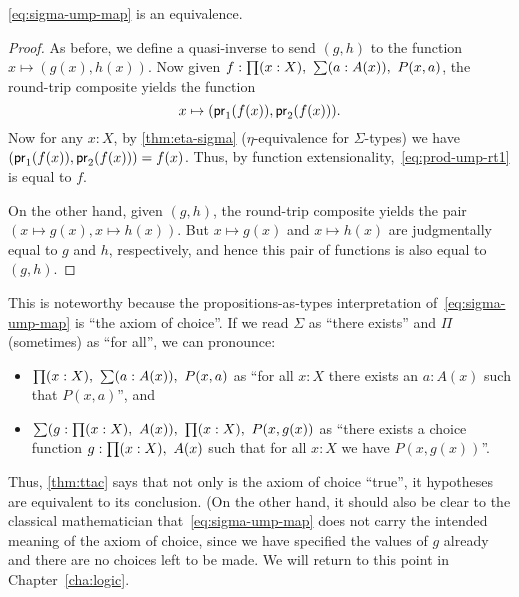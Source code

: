 \begin{thm}\label{thm:ttac}
  \eqref{eq:sigma-ump-map} is an equivalence.
\end{thm}
\begin{proof}
  As before, we define a quasi-inverse to send $(g,h)$ to the function $x\mapsto (g(x),h(x))$.
  Now given $f:\prd{x:X} \sm{a:A(x)} P(x,a)$, the round-trip composite yields the function
  \begin{equation}
    x\mapsto (\mathsf{pr}_{1}(f(x)),\mathsf{pr}_{2}(f(x))).\label{eq:prod-ump-rt1}
  \end{equation}
  Now for any $x:X$, by \autoref{thm:eta-sigma} ($\eta$-equivalence for $\Sigma$-types) we have $(\mathsf{pr}_{1}(f(x)),\mathsf{pr}_{2}(f(x))) = f(x)$.
  Thus, by function extensionality,~\eqref{eq:prod-ump-rt1} is equal to $f$.

  On the other hand, given $(g,h)$, the round-trip composite yields the pair $(x\mapsto g(x),x\mapsto h(x))$.
  But $x\mapsto g(x)$ and $x\mapsto h(x)$ are judgmentally equal to $g$ and $h$, respectively, and hence this pair of functions is also equal to $(g,h)$.
\end{proof}

This is noteworthy because the propositions-as-types interpretation of~\eqref{eq:sigma-ump-map} is ``the axiom of choice''.
If we read $\Sigma$ as ``there exists'' and $\Pi$ (sometimes) as ``for all'', we can pronounce:
\begin{itemize}
\item $\prd{x:X} \sm{a:A(x)} P(x,a)$ as ``for all $x:X$ there exists an $a:A(x)$ such that $P(x,a)$'', and
\item $\sm{g:\prd{x:X} A(x)} \prd{x:X} P(x,g(x))$ as ``there exists a choice function $g:\prd{x:X} A(x)$ such that for all $x:X$ we have $P(x,g(x))$''.
\end{itemize}
Thus, \autoref{thm:ttac} says that not only is the axiom of choice ``true'', it hypotheses are equivalent to its conclusion.
(On the other hand, it should also be clear to the classical mathematician that~\eqref{eq:sigma-ump-map} does not carry the intended meaning of the axiom of choice, since we have specified the values of $g$ already and there are no choices left to be made.
We will return to this point in Chapter~\ref{cha:logic}.

